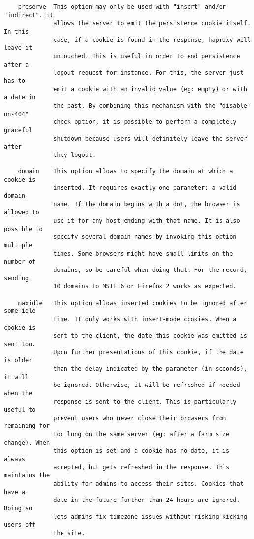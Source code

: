 \begin{verbatim}
    preserve  This option may only be used with "insert" and/or "indirect". It
              allows the server to emit the persistence cookie itself. In this
              case, if a cookie is found in the response, haproxy will leave it
              untouched. This is useful in order to end persistence after a
              logout request for instance. For this, the server just has to
              emit a cookie with an invalid value (eg: empty) or with a date in
              the past. By combining this mechanism with the "disable-on-404"
              check option, it is possible to perform a completely graceful
              shutdown because users will definitely leave the server after
              they logout.

    domain    This option allows to specify the domain at which a cookie is
              inserted. It requires exactly one parameter: a valid domain
              name. If the domain begins with a dot, the browser is allowed to
              use it for any host ending with that name. It is also possible to
              specify several domain names by invoking this option multiple
              times. Some browsers might have small limits on the number of
              domains, so be careful when doing that. For the record, sending
              10 domains to MSIE 6 or Firefox 2 works as expected.

    maxidle   This option allows inserted cookies to be ignored after some idle
              time. It only works with insert-mode cookies. When a cookie is
              sent to the client, the date this cookie was emitted is sent too.
              Upon further presentations of this cookie, if the date is older
              than the delay indicated by the parameter (in seconds), it will
              be ignored. Otherwise, it will be refreshed if needed when the
              response is sent to the client. This is particularly useful to
              prevent users who never close their browsers from remaining for
              too long on the same server (eg: after a farm size change). When
              this option is set and a cookie has no date, it is always
              accepted, but gets refreshed in the response. This maintains the
              ability for admins to access their sites. Cookies that have a
              date in the future further than 24 hours are ignored. Doing so
              lets admins fix timezone issues without risking kicking users off
              the site.


\end{verbatim}
